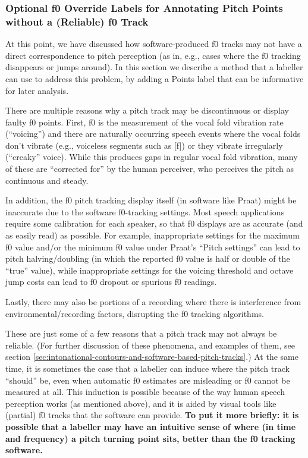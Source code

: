 \documentclass[11pt, twoside]{memoir}
\begin{document}
\subsubsection{Optional f0 Override Labels for Annotating Pitch Points without a (Reliable) f0 Track}\label{sec:optional-f0-override-labels-for-annotating-pitch-points-without-a-reliable-f0-track}

At this point, we have discussed how software-produced f0 tracks may not have a direct correspondence to pitch perception (as in, e.g., cases where the f0 tracking disappears or jumps around). In this section we describe a method that a labeller can use to address this problem, by adding a Points label that can be informative for later analysis.

There are multiple reasons why a pitch track may be discontinuous or display faulty f0 points. First, f0 is the measurement of the vocal fold vibration rate (“voicing”) and there are naturally occurring speech events where the vocal folds don’t vibrate (e.g., voiceless segments such as [f]) or they vibrate irregularly (“creaky” voice). While this produces gaps in regular vocal fold vibration, many of these are “corrected for” by the human perceiver, who perceives the pitch as continuous and steady.

In addition, the f0 pitch tracking display itself (in software like Praat) might be inaccurate due to the software f0-tracking settings. Most speech applications require some calibration for each speaker, so that f0 displays are as accurate (and as easily read) as possible. For example, inappropriate settings for the maximum f0 value and/or the minimum f0 value under Praat’s “Pitch settings” can lead to pitch halving\slash doubling (in which the reported f0 value is half or double of the “true” value), while inappropriate settings for the voicing threshold and octave jump costs can lead to f0 dropout or spurious f0 readings.

Lastly, there may also be portions of a recording where there is interference from environmental\slash recording factors, disrupting the f0 tracking algorithms.

These are just some of a few reasons that a pitch track may not always be reliable. (For further discussion of these phenomena, and examples of them, see section \ref{sec:intonational-contours-and-software-based-pitch-tracks}.) At the same time, it is sometimes the case that a labeller can induce where the pitch track “should” be, even when automatic f0 estimates are misleading or f0 cannot be measured at all. This induction is possible because of the way human speech perception works (as mentioned above), and it is aided by visual tools like (partial) f0 tracks that the software can provide. \textbf{To put it more briefly: it is possible that a labeller may have an intuitive sense of where (in time and frequency) a pitch turning point sits, better than the f0 tracking software.}
\end{document}
